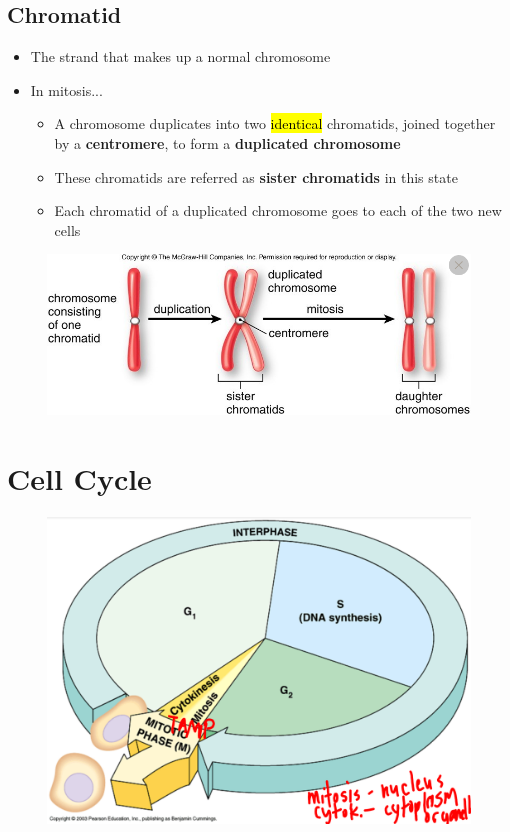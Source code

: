 \documentclass[a4paper,12pt]{article}
\begin{document}
\subsection{Chromatid}
\begin{itemize}
    \item{The strand that makes up a normal chromosome}
    \item{
            In mitosis...
            \begin{itemize}
                \item{A chromosome duplicates into two \hl{identical} chromatids, joined together by a \textbf{centromere}, to form a \textbf{duplicated chromosome}}
                \item{These chromatids are referred as \textbf{sister chromatids} in this state}
                \item{Each chromatid of a duplicated chromosome goes to each of the two new cells}
            \end{itemize}
        }
\end{itemize}

\begin{figure}[H] \includegraphics[width=\textwidth]{chromosome} \end{figure}

\section{Cell Cycle}
\begin{figure}[H] \includegraphics[width=\textwidth]{cellcycle} \end{figure}
\end{document}
